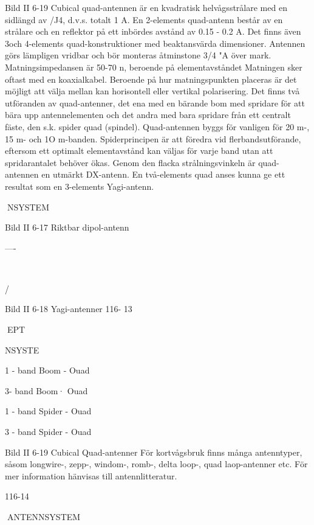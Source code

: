 Bild II 6-19
Cubical quad-antennen är en kvadratisk
helvågsstrålare med en sidlängd av /J4,
d.v.s. totalt 1 A.
En 2-elements quad-antenn består av
en strålare och en reflektor på ett inbördes
avstånd av 0.15 - 0.2 A. Det finns även 3och 4-elements quad-konstruktioner med
beaktansvärda dimensioner. Antennen görs
lämpligen vridbar och bör monteras åtminstone 3/4 "A över mark.
Matningsimpedansen är 50-70 n, beroende på elementavståndet Matningen sker
oftast med en koaxialkabel. Beroende på
hur matningspunkten placeras är det möjligt
att välja mellan kan horisontell eller vertikal
polarisering.
Det finns två utföranden av quad-antenner, det ena med en bärande bom med
spridare för att bära upp antennelementen
och det andra med bara spridare från ett
centralt fäste, den s.k. spider quad (spindel).
Quad-antennen byggs för vanligen för
20 m-, 15 m- och 1O m-banden. Spiderprincipen är att föredra vid flerbandsutförande, eftersom ett optimalt elementavstånd kan väljas för varje band utan att
spridarantalet behöver ökas.
Genom den flacka strålningsvinkeln är
quad-antennen en utmärkt DX-antenn. En
två-elements quad anses kunna ge ett resultat som en 3-elements Yagi-antenn.

NSYSTEM

Bild II 6-17 Riktbar dipol-antenn

----

~

/

Bild II 6-18 Yagi-antenner
116- 13

EPT

NSYSTE

1 - band Boom - Ouad

3- band Boom· Ouad

1 - band Spider - Ouad

3 - band Spider - Ouad

Bild II 6-19 Cubical Quad-antenner
För kortvågsbruk finns många antenntyper, såsom longwire-, zepp-, windom-, romb-, delta
loop-, quad laop-antenner etc. För mer information hänvisas till antennlitteratur.

116-14

ANTENNSYSTEM
